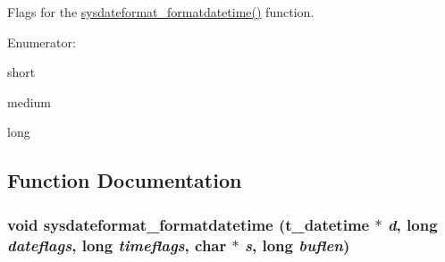 Flags for the \hyperlink{group__systime_ga6219d6f6543e65431086c34c35199e82}{sysdateformat\_\-formatdatetime()} function. \begin{Desc}
\item[Enumerator: ]\par
\begin{description}
\item[{\em 
\hypertarget{group__systime_gga26a8d02aa000843530dcb2d350766951a03c806745c3aad02d768797ead649e20}{
SYSDATEFORMAT\_\-FLAGS\_\-SHORT}
\label{group__systime_gga26a8d02aa000843530dcb2d350766951a03c806745c3aad02d768797ead649e20}
}]short \item[{\em 
\hypertarget{group__systime_gga26a8d02aa000843530dcb2d350766951a44be9bae61adf4f4b802989465768d63}{
SYSDATEFORMAT\_\-FLAGS\_\-MEDIUM}
\label{group__systime_gga26a8d02aa000843530dcb2d350766951a44be9bae61adf4f4b802989465768d63}
}]medium \item[{\em 
\hypertarget{group__systime_gga26a8d02aa000843530dcb2d350766951a0cdecdf057e390773e60c3d71de7faf4}{
SYSDATEFORMAT\_\-FLAGS\_\-LONG}
\label{group__systime_gga26a8d02aa000843530dcb2d350766951a0cdecdf057e390773e60c3d71de7faf4}
}]long \end{description}
\end{Desc}



\subsection{Function Documentation}
\hypertarget{group__systime_ga6219d6f6543e65431086c34c35199e82}{
\subsubsection[{sysdateformat\_\-formatdatetime}]{\setlength{\rightskip}{0pt plus 5cm}void sysdateformat\_\-formatdatetime ({\bf t\_\-datetime} $\ast$ {\em d}, \/  long {\em dateflags}, \/  long {\em timeflags}, \/  char $\ast$ {\em s}, \/  long {\em buflen})}}
\label{group__systime_ga6219d6f6543e65431086c34c35199e82}


